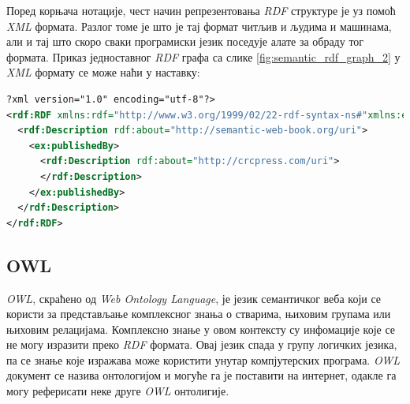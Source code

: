\documentclass[12pt,oneside]{memoir}
\begin{document}
Поред корњача нотације, чест начин репрезентовања \textit{RDF} структуре је уз помоћ \textit{XML} формата. Разлог томе је што је тај формат читљив и људима и машинама, али и тај што скоро сваки програмиски језик поседује алате за обраду тог формата. Приказ једноставног \textit{RDF} графа са слике \ref{fig:semantic_rdf_graph_2} у \textit{XML} формату се може наћи у наставку:

\begin{lstlisting}[language=XML]
?xml version="1.0" encoding="utf-8"?>
<rdf:RDF xmlns:rdf="http://www.w3.org/1999/02/22-rdf-syntax-ns#"xmlns:ex ="http:/example.org/">
  <rdf:Description rdf:about="http://semantic-web-book.org/uri">
    <ex:publishedBy>
      <rdf:Description rdf:about="http://crcpress.com/uri">
      </rdf:Description>
    </ex:publishedBy>
  </rdf:Description>
</rdf:RDF>
\end{lstlisting}




\subsection{OWL}
\label{subsec:semantic_owl}

\textit{OWL}, скраћено од \textit{Web Ontology Language}, је језик семантичког веба који се користи за представљање комплексног знања о стварима, њиховим групама или њиховим релацијама. Комплексно знање у овом контексту су инфомације које се не могу изразити преко \textit{RDF} формата. Овај језик спада у групу логичких језика, па се знање које изражава може користити унутар компјутерских програма. \textit{OWL} документ се назива онтологијом и могуће га је поставити на интернет, одакле га могу реферисати неке друге \textit{OWL} онтолигије. \cite{semantic}
\end{document}
